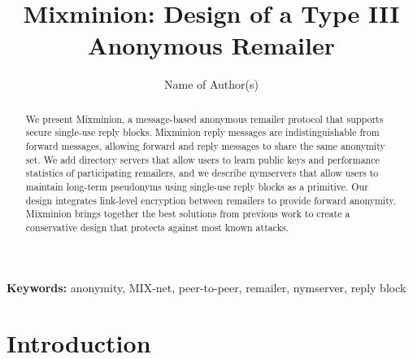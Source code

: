 \documentclass{llncs}
\newcommand\emailaddr{\begingroup \def\UrlLeft{<}\def\UrlRight{>}\urlstyle{tt}\Url}
\begin{document}

\title{Mixminion: Design of a Type III Anonymous Remailer}

% 
\author{Name of Author(s)}


\maketitle
\pagestyle{empty} 
  
\begin{abstract}

We present Mixminion, a message-based anonymous remailer protocol that
supports secure single-use reply blocks. Mixminion reply messages are
indistinguishable from forward messages, allowing forward and reply
messages to share
the same anonymity set. We add directory servers that allow users to
learn public keys and performance statistics of participating remailers,
and we describe nymservers that allow users to maintain long-term
pseudonyms using single-use reply blocks as a primitive. Our design
integrates link-level encryption between remailers to provide
forward anonymity. Mixminion brings together the best solutions from
previous work to create a conservative design that protects against most
known attacks.


\end{abstract}

\noindent \textbf{Keywords:} anonymity, MIX-net, peer-to-peer, remailer, nymserver, reply block


\section{Introduction}
\label{sec:intro}
\end{document}
